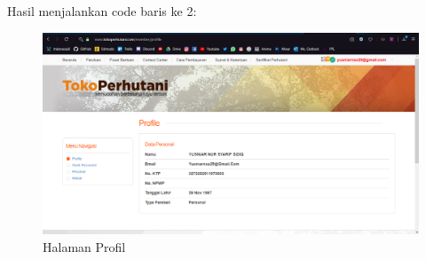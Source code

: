 Hasil menjalankan code baris ke 2:
\begin{figure}[h]
	\centering
	\includegraphics[scale=0.25]{figures/735profilektp}
	\caption{Halaman Profil}
\end{figure}